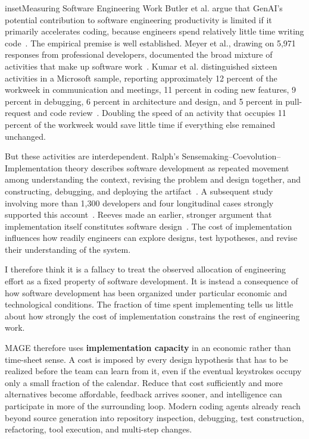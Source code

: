 \begin{bookbox}{inset}{Measuring Software Engineering Work}
\label{inset-measuring-software-engineering-work}
Butler et al. argue that GenAI's potential contribution to software engineering productivity is limited if it primarily accelerates coding, because engineers spend relatively little time writing code~\citep{butler2026eightmyths}. The empirical premise is well established. Meyer et al., drawing on 5,971 responses from professional developers, documented the broad mixture of activities that make up software work~\citep{meyer2021goodday}. Kumar et al. distinguished sixteen activities in a Microsoft sample, reporting approximately 12 percent of the workweek in communication and meetings, 11 percent in coding new features, 9 percent in debugging, 6 percent in architecture and design, and 5 percent in pull-request and code review~\citep{kumar2025timewarp}. Doubling the speed of an activity that occupies 11 percent of the workweek would save little time if everything else remained unchanged.

But these activities are interdependent. Ralph's Sensemaking--Coevolution--Implementation theory describes software development as repeated movement among understanding the context, revising the problem and design together, and constructing, debugging, and deploying the artifact~\citep{ralph2015sci}. A subsequent study involving more than 1,300 developers and four longitudinal cases strongly supported this account~\citep{ralph2016processtheory}. Reeves made an earlier, stronger argument that implementation itself constitutes software design~\citep{reeves1992whatissoftwaredesign}. The cost of implementation influences how readily engineers can explore designs, test hypotheses, and revise their understanding of the system.

I therefore think it is a fallacy to treat the observed allocation of engineering effort as a fixed property of software development. It is instead a consequence of how software development has been organized under particular economic and technological conditions. The fraction of time spent implementing tells us little about how strongly the cost of implementation constrains the rest of engineering work.
\end{bookbox}

MAGE therefore uses \textbf{implementation capacity} in an economic rather than time-sheet sense. A cost is imposed by every design hypothesis that has to be realized before the team can learn from it, even if the eventual keystrokes occupy only a small fraction of the calendar. Reduce that cost sufficiently and more alternatives become affordable, feedback arrives sooner, and intelligence can participate in more of the surrounding loop. Modern coding agents already reach beyond source generation into repository inspection, debugging, test construction, refactoring, tool execution, and multi-step changes.

